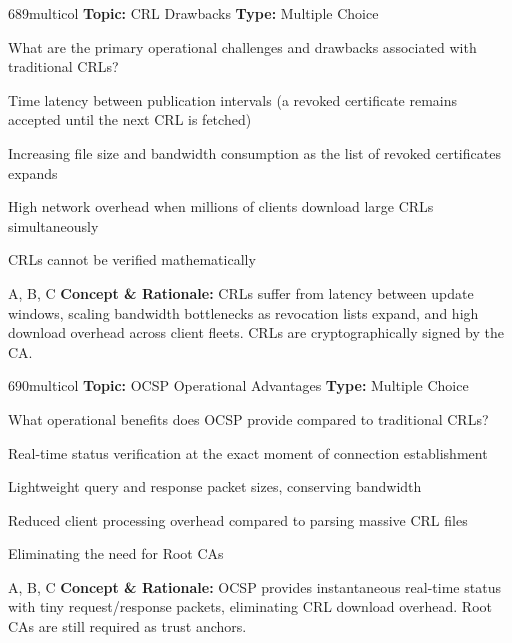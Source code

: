 \begin{qcard}{689}{multicol}
\textcolor{darkslate!75}{\small\textbf{Topic:} CRL Drawbacks \hfill \textbf{Type:} Multiple Choice}\vspace{0.4em}\par
What are the primary operational challenges and drawbacks associated with traditional CRLs?
\begin{qoptions}
\item Time latency between publication intervals (a revoked certificate remains accepted until the next CRL is fetched)
\item Increasing file size and bandwidth consumption as the list of revoked certificates expands
\item High network overhead when millions of clients download large CRLs simultaneously
\item CRLs cannot be verified mathematically
\end{qoptions}
\end{qcard}
\nopagebreak
\begin{explainbox}{A, B, C}
\textbf{Concept \& Rationale:} CRLs suffer from latency between update windows, scaling bandwidth bottlenecks as revocation lists expand, and high download overhead across client fleets. CRLs are cryptographically signed by the CA.
\end{explainbox}

\begin{qcard}{690}{multicol}
\textcolor{darkslate!75}{\small\textbf{Topic:} OCSP Operational Advantages \hfill \textbf{Type:} Multiple Choice}\vspace{0.4em}\par
What operational benefits does OCSP provide compared to traditional CRLs?
\begin{qoptions}
\item Real-time status verification at the exact moment of connection establishment
\item Lightweight query and response packet sizes, conserving bandwidth
\item Reduced client processing overhead compared to parsing massive CRL files
\item Eliminating the need for Root CAs
\end{qoptions}
\end{qcard}
\nopagebreak
\begin{explainbox}{A, B, C}
\textbf{Concept \& Rationale:} OCSP provides instantaneous real-time status with tiny request/response packets, eliminating CRL download overhead. Root CAs are still required as trust anchors.
\end{explainbox}

